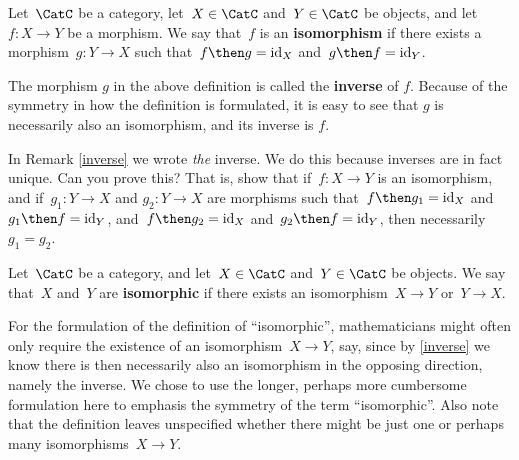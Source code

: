 
\begin{shaded}
\begin{definition}[Isomorphism]
Let~$\CatC$ be a category, let~$X \in \CatC$ and~$Y \in \CatC$ be objects, and let~$f\colon X \to Y$ be a morphism. We say that~$f$ is an \textbf{isomorphism} if there exists a morphism~$g\colon Y \to X$ such that~$f \then g = \text{id}_X$ and~$g \then f = \text{id}_Y$. 
\end{definition}

\begin{remark}\label{inverse}
The morphism $g$ in the above definition is called the \textbf{inverse} of $f$. Because of the symmetry in how the definition is formulated, it is easy to see that $g$ is necessarily also an isomorphism, and its inverse is $f$. 
\end{remark}
\end{shaded}

\begin{exercise}
In Remark \ref{inverse} we wrote \emph{the} inverse. We do this because inverses are in fact unique. Can you prove this?
That is, show that if~$f\colon X \to Y$ is an isomorphism, and if~$g_1\colon Y \to X$ and $g_2\colon Y \to X$ are morphisms such that~$f \then g_1 = \text{id}_X$ and~$g_1 \then f = \text{id}_Y$, and~$f \then g_2 = \text{id}_X$ and~$g_2 \then f = \text{id}_Y$, then necessarily~$g_1 = g_2$. 
\end{exercise}

\begin{shaded}
\begin{definition}[Isomorphic]
Let~$\CatC$ be a category, and let~$X \in \CatC$ and~$Y \in \CatC$ be objects. We say that~$X$ and~$Y$ are \textbf{isomorphic} if there exists an isomorphism~$X \to Y$ or~$Y \to X$. 
\end{definition}
\end{shaded}

For the formulation of the definition of ``isomorphic'', mathematicians might often only require the existence of an isomorphism~$X \to Y$, say, since by \cref{inverse} we know there is then necessarily also an isomorphism in the opposing direction, namely the inverse. We chose to use the longer, perhaps more cumbersome formulation here to emphasis the symmetry of the term ``isomorphic''. Also note that the definition leaves unspecified whether there might be just one or perhaps many isomorphisms~$X \to Y$. 

